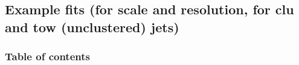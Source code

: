 \documentclass[8pt]{beamer}
\begin{document}
%      
%     
%      
%      
%     
%      
 
  \subsection{Example fits (for scale and resolution, for clu and tow (unclustered) jets)}

\begin{frame}
 \frametitle{Table of contents}
 
\end{frame}
\end{document}
